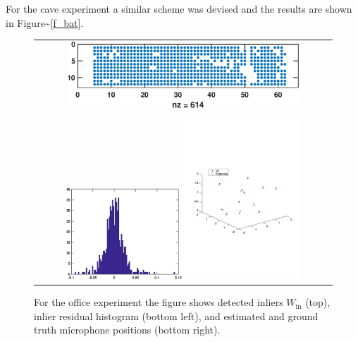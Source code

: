 \documentclass[
]{book}
\def\Win{W_{\text{in}}}
\begin{document}
For the cave experiment a similar scheme was devised and the results are shown in Figure\textasciitilde{}\ref{f_bat}.

\begin{figure}
\begin{tabular}{c}
\includegraphics[width=0.8\textwidth]{original_papers/icassp_2018/figs/MH454_F_inl.eps} \\
\includegraphics[width=0.4\textwidth]{original_papers/icassp_2018/figs/MH454_F_res.eps} 
\includegraphics[width=0.4\textwidth]{original_papers/icassp_2018/figs/MH454_F_fig_new.pdf} 
\end{tabular}
\caption{For the office experiment the figure shows  detected inliers $\Win$ (top),  inlier residual histogram (bottom left), and  estimated and ground truth microphone positions (bottom right).}
\label{f_454H}
\end{figure}
\end{document}
